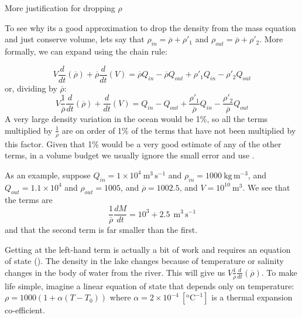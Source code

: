 \begin{derivbox}[label={box:volume}]{More justification for dropping $\rho$}

    To see why its a good approximation to drop the density from the mass equation and just conserve volume, lets say that $\rho_{in} = \overline{\rho} + \rho'_{1}$ and $\rho_{out} = \overline{\rho} + \rho'_{2}$.  
    More formally, we can expand  using the chain rule:
    
    \begin{equation}
        V\frac{d}{dt}\left(\overline{\rho} \right) + \overline{\rho} \frac{d}{dt}\left(V\right) = \overline{\rho}Q_{in} - \overline{\rho}Q_{out} + \rho'_{1} Q_{in} - \rho'_{2} Q_{out}
    \end{equation}
    or, dividing by $\overline{\rho}$:
    \begin{equation}
        V\frac{1}{\overline{\rho}}\frac{d}{dt}\left(\overline{\rho} \right) + \frac{d}{dt}\left(V\right) = Q_{in} - Q_{out} + \frac{\rho'_{1}}{\overline{\rho}} Q_{in} - \frac{\rho'_{2}}{\overline{\rho}} Q_{out}
    \end{equation}
    A very large density variation in the ocean would be 1\%, so all the terms multiplied by $\frac{1}{\rho}$ are on order of 1\% of the terms that have not been multiplied by this factor.  Given that 1\% would be a very good estimate of any of the other terms, in a volume budget we usually ignore the small error and use .  
    
    As an example, suppose $Q_{in} = 1\times10^{4}\ \mathrm{m^3\,s^{-1}}$ and $\rho_{in}=1000\ \mathrm{kg\,m^{-3}}$, and  $Q_{out} = 1.1\times10^{4}$ and $\rho_{out} = 1005$, and $\overline{\rho} = 1002.5$, and $V=10^{10}\ \mathrm{m^3}$.  We see that the terms are 
    \begin{equation}
    \frac{1}{\overline{\rho}}\frac{dM}{dt} = 10^{3} + 2.5 \ \ \mathrm{m^3\,s^{-1}}   
    \end{equation}
and that the second term is far smaller than the first.  

Getting at the left-hand term is actually a bit of work and requires an equation of state ().  The density in the lake changes because of temperature or salinity changes in the body of water from the river.  This will give us $V\frac{1}{\rho}\frac{d}{dt}\left(\overline{\rho}\right)$.  To make life simple, imagine a linear equation of state that depends only on temperature: $\rho = 1000 (1 + \alpha (T - T_0))$ where $\alpha = 2\times10^{-4}\ \mathrm{\left[^oC^{-1}\right]}$ is a thermal expansion co-efficient.  
\end{derivbox}


